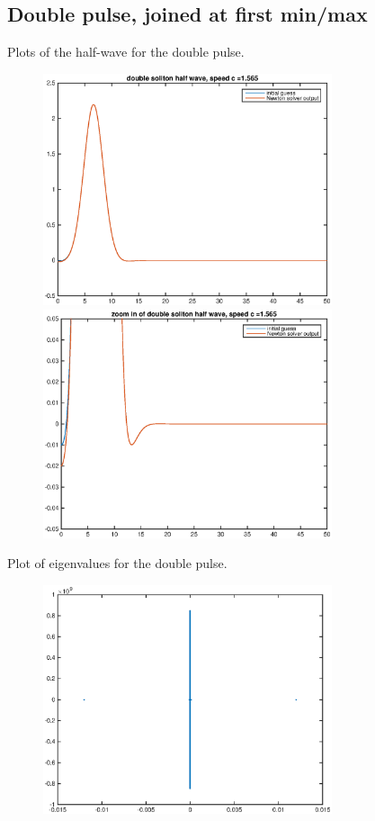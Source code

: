 \documentclass[12pt]{article}
\begin{document}
\subsection*{Double pulse, joined at first min/max}
Plots of the half-wave for the double pulse.
	\begin{figure}[H]
	\includegraphics[width=8.5cm]{D1_fd50_half.eps}
	\includegraphics[width=8.5cm]{D1_fd50_half_zoom.eps}
	\end{figure}

Plot of eigenvalues for the double pulse.
	\begin{figure}[H]
	\includegraphics[width=8.5cm]{D1_fd50_val.eps}
	\end{figure}
\end{document}
